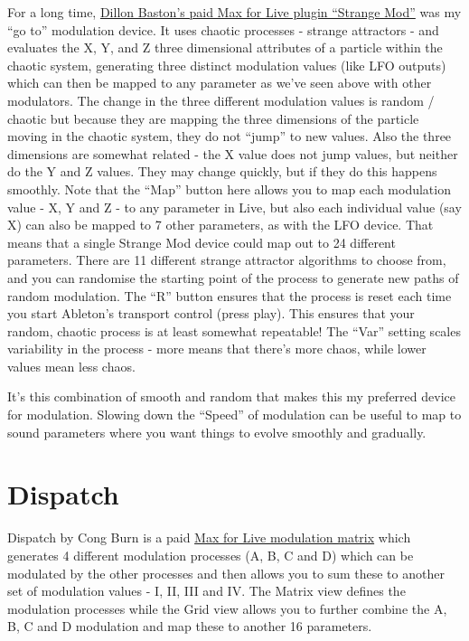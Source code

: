\documentclass[
  12pt,
  letterpaper,
  oneside,
  open=any]{scrbook}
\makeatletter
\newcommand*\pandocbounded[1]{%
  \sbox\pandoc@box{#1}%
  \Gscale@div\@tempa{\textheight}{\dimexpr\ht\pandoc@box+\dp\pandoc@box\relax}%
  \Gscale@div\@tempb{\linewidth}{\wd\pandoc@box}%
  \ifdim\@tempb\p@<\@tempa\p@\let\@tempa\@tempb\fi%
  \ifdim\@tempa\p@<\p@\scalebox{\@tempa}{\usebox\pandoc@box}%
  \else\usebox{\pandoc@box}%
  \fi%
}
\makeatother
\begin{document}
For a long time,
\href{https://maxforlive.com/library/device/6872/strange-mod}{Dillon
Baston's paid Max for Live plugin ``Strange Mod''} was my ``go to''
modulation device. It uses chaotic processes - strange attractors - and
evaluates the X, Y, and Z three dimensional attributes of a particle
within the chaotic system, generating three distinct modulation values
(like LFO outputs) which can then be mapped to any parameter as we've
seen above with other modulators. The change in the three different
modulation values is random / chaotic but because they are mapping the
three dimensions of the particle moving in the chaotic system, they do
not ``jump'' to new values. Also the three dimensions are somewhat
related - the X value does not jump values, but neither do the Y and Z
values. They may change quickly, but if they do this happens smoothly.
Note that the ``Map'' button here allows you to map each modulation
value - X, Y and Z - to any parameter in Live, but also each individual
value (say X) can also be mapped to 7 other parameters, as with the LFO
device. That means that a single Strange Mod device could map out to 24
different parameters. There are 11 different strange attractor
algorithms to choose from, and you can randomise the starting point of
the process to generate new paths of random modulation. The ``R'' button
ensures that the process is reset each time you start Ableton's
transport control (press play). This ensures that your random, chaotic
process is at least somewhat repeatable! The ``Var'' setting scales
variability in the process - more means that there's more chaos, while
lower values mean less chaos.

It's this combination of smooth and random that makes this my preferred
device for modulation. Slowing down the ``Speed'' of modulation can be
useful to map to sound parameters where you want things to evolve
smoothly and gradually.

\pandocbounded{\texttt{[image: images/Strange\_mod.png]}}

\section{Dispatch}\label{dispatch}

Dispatch by Cong Burn is a paid
\href{https://maxforlive.com/library/device/7361/dispatch-global-modulation-matrix}{Max
for Live modulation matrix} which generates 4 different modulation
processes (A, B, C and D) which can be modulated by the other processes
and then allows you to sum these to another set of modulation values -
I, II, III and IV. The Matrix view defines the modulation processes
while the Grid view allows you to further combine the A, B, C and D
modulation and map these to another 16 parameters.
\end{document}
